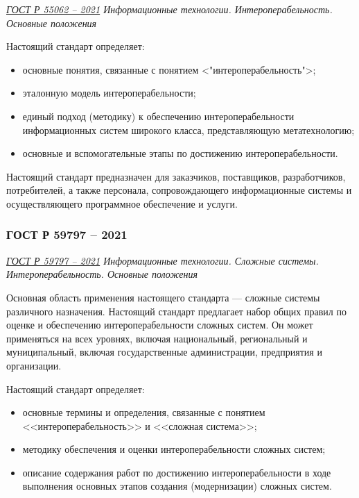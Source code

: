 \emph{\href{https://docs.cntd.ru/document/1200181340}{ГОСТ Р 55062 -- 2021}
Информационные технологии. Интероперабельность. Основные положения
}

Настоящий стандарт определяет:

\begin{itemize}
	\item основные понятия, связанные с понятием <"интероперабельность">;
	\item эталонную модель интероперабельности;
	\item единый подход (методику) к обеспечению интероперабельности
		информационных систем широкого класса, представляющую метатехнологию;
	\item основные и вспомогательные этапы по достижению интероперабельности.
\end{itemize}

Настоящий стандарт предназначен для заказчиков, поставщиков, разработчиков,
потребителей, а также персонала, сопровождающего информационные системы
и осуществляющего программное обеспечение и услуги.

\subsubsection{ГОСТ Р 59797 -- 2021}

\emph{\href{https://docs.cntd.ru/document/1200181353}{ГОСТ Р 59797 -- 2021}
Информационные технологии. Сложные системы. Интероперабельность. Основные положения
}

Основная область применения настоящего стандарта
--- сложные системы различного назначения.
Настоящий стандарт предлагает набор общих правил по оценке
и обеспечению интероперабельности сложных систем.
Он может применяться на всех уровнях, включая национальный,
региональный и муниципальный,
включая государственные администрации, предприятия и организации.

Настоящий стандарт определяет:

\begin{itemize}
	\item основные термины и определения,
		связанные с понятием <<интероперабельность>> и <<сложная система>>;
	\item методику обеспечения
		и оценки интероперабельности сложных систем;
	\item описание содержания работ
		по достижению интероперабельности в ходе выполнения основных
		этапов создания (модернизации) сложных систем.
\end{itemize}

